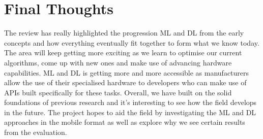 \documentclass{article}
\begin{document}
\section{Final Thoughts}
The review has really highlighted the progression ML and DL from the early concepts and how everything eventually fit 
together to form what we know today. The area will keep getting more exciting as we learn to optimise our current 
algorithms, come up with new ones and make use of advancing hardware capabilities. ML and DL is getting more and more 
accessible as manufacturers allow the use of their specialised hardware to developers who can make use of APIs built 
specifically for these tasks. Overall, we have built on the solid foundations of previous research and it’s interesting 
to see how the field develops in the future. The project hopes to aid the field by investigating the ML and DL 
approaches in the mobile format as well as explore why we see certain results from the evaluation.
\printbibliography
\end{document}
